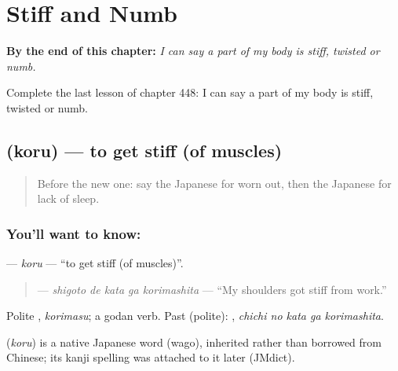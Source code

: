 
\chapter{Stiff and Numb}
\label{ch:ja-stiff-and-numb}

\begin{chapteropening}
\textbf{By the end of this chapter:} \emph{I can say a part of my body is stiff, twisted or numb.}

Complete the last lesson of chapter 448: I can say a part of my body is stiff, twisted or numb.
\end{chapteropening}

\section[\texorpdfstring{\ja{こる} (koru)}{こる (koru)}]{ (koru) — to get stiff (of muscles)}

\label{lesson:JA-C448-koru}



\begin{quote}
Before the new one: say the Japanese for worn out, then the Japanese for lack of sleep.
\end{quote}

\subsection*{You'll want to know: }
\textbf{} — \emph{koru} — \textquotedblleft{}to get stiff (of muscles)\textquotedblright{}.

\begin{quote}
\textbf{  } — \emph{shigoto de kata ga korimashita} — \textquotedblleft{}My shoulders got stiff from work.\textquotedblright{}
\end{quote}

Polite \textbf{}, \emph{korimasu}; a godan verb. Past (polite): \textbf{  }, \emph{chichi no kata ga korimashita}.

\begin{cousinweb}
\textbf{} (\emph{koru}) is a native Japanese word (wago), inherited rather than borrowed from Chinese; its kanji spelling was attached to it later (JMdict).
\end{cousinweb}

